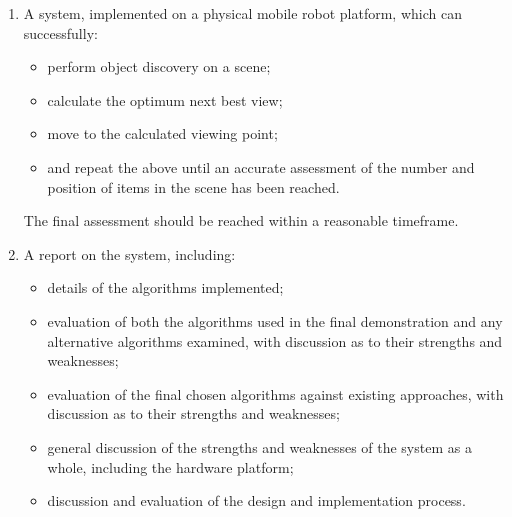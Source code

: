 \documentclass[a4paper,11pt,english]{article}
\begin{document}
\begin{enumerate}
	
	\item A system, implemented on a physical mobile robot platform, which can successfully:
	\begin{itemize}
		\item perform object discovery on a scene;
		\item calculate the optimum next best view;
		\item move to the calculated viewing point;
		\item and repeat the above until an accurate assessment of the number and position of items in the scene has been reached.
	\end{itemize}
	The final assessment should be reached within a reasonable timeframe.

	\item A report on the system, including:
	\begin{itemize}
		\item details of the algorithms implemented;
		\item evaluation of both the algorithms used in the final demonstration and any alternative algorithms examined, with discussion as to their strengths and weaknesses;
		\item evaluation of the final chosen algorithms against existing approaches, with discussion as to their strengths and weaknesses;
		\item general discussion of the strengths and weaknesses of the system as a whole, including the hardware platform;
		\item discussion and evaluation of the design and implementation process.
	\end{itemize}

\end{enumerate}


\newpage


\end{document}

